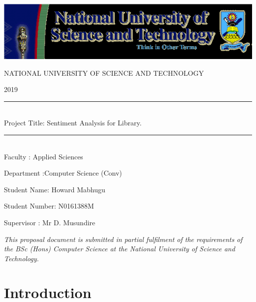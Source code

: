 \documentclass[12pt]{report}
\begin{document}
	\begin{titlepage}
		\centering
		\vspace*{0.5 cm}
		\includegraphics[scale=0.75]{nust.png}	%
		\begin{center}    \textsc{\Large   NATIONAL UNIVERSITY OF SCIENCE AND TECHNOLOGY}\\[2.0 cm]	\end{center}%
		\textsc{\Large 2019  }\\[0.5 cm]				%
		\rule{\linewidth}{0.2 mm} \\[0.4 cm] 
		Project Title: Sentiment Analysis for Library.
		\rule{\linewidth}{0.2 mm} \\[1.5 cm]
		
		
		Faculty : Applied Sciences 
		
		
		Department :Computer Science (Conv) 
		
		
		Student Name: Howard Mabhugu
		
		Student Number: N0161388M
		
		Supervisor : Mr D. Musundire
		
		
		
		\null
		\null
		\null
		\null
		\null
		\null
		\null
		\textit{This proposal document is submitted in partial fulfilment of the requirements of the BSc (Hons) Computer Science at the National University of Science  and Technology.}
		
	\end{titlepage}
	
	\tableofcontents
	
	\chapter{Introduction}
\end{document}
